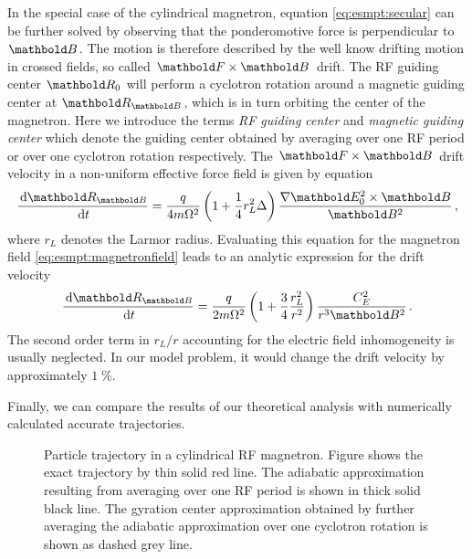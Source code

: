 In the special case of the cylindrical magnetron, equation
\eqref{eq:esmpt:secular} can be further solved by observing
that the ponderomotive force is perpendicular to $\mb B$.
The motion is therefore described by the well know drifting
motion in crossed fields, so called $\mb F\times\mb B$ drift.
The \ac{RF} guiding center $\mb R_0$
will perform a cyclotron rotation around a magnetic guiding
center at $\mb R_{\mb B}$, which is in turn orbiting the center
of the magnetron. Here we introduce the terms {\em RF
guiding center} and {\em magnetic guiding center} which
denote the guiding center obtained by averaging over one \ac{RF}
period or over one cyclotron rotation respectively.
The $\mb F\times \mb B$ drift velocity in a non-uniform
effective force field \citep{baumjohan2012} is given by equation
\begin{equation}
\frac{\de \mb R_{\mb B}}{\de t} = 
\frac{q}{4m\Omega^2}
\left(1+\frac{1}{4}r_L^2\Delta\right)
\frac{\nabla\mb E_0^2\times\mb B}{\mb B^2}\,,
\end{equation}
where $r_L$ denotes the Larmor radius.
Evaluating this equation
for the magnetron field \eqref{eq:esmpt:magnetronfield} leads
to an analytic expression for the drift velocity
\begin{equation}
\frac{\de \mb R_{\mb B}}{\de t} = 
\frac{q}{2m\Omega^2}
\left(1+\frac{3}{4}\frac{r_L^2}{r^2}\right)
\frac{C_E^2}{r^3\mb B^2}\,.
\end{equation}
The second order term in $r_L/r$ accounting for the electric field
inhomogeneity is usually neglected. In our model problem, it would
change the drift velocity by approximately $1\;\%$.

Finally, we can compare the results of our theoretical analysis with
numerically calculated accurate trajectories.


\begin{figure}
\caption{Particle trajectory in a cylindrical \ac{RF} magnetron.
Figure shows the exact trajectory by thin solid red line. The
adiabatic approximation resulting from averaging over one
\ac{RF} period is shown in thick solid black line. The gyration
center approximation obtained by further averaging the
adiabatic approximation over one cyclotron rotation is shown
as dashed grey line.}
\end{figure}

